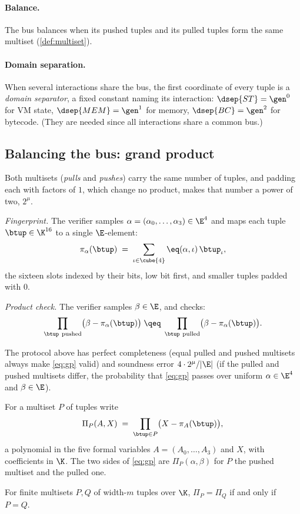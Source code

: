 \paragraph{Balance.} The bus balances when its pushed tuples and its pulled tuples form the same multiset (\ref{def:multiset}).

\paragraph{Domain separation.} When several interactions share the bus, the first coordinate of every tuple is a \emph{domain separator}, a fixed constant naming its interaction: $\dsep{ST}=\gen^{0}$ for VM state, $\dsep{MEM}=\gen^{1}$ for memory, $\dsep{BC}=\gen^{2}$ for bytecode. (They are needed since all interactions share a common bus.)

\subsection{Balancing the bus: grand product}\label{sec:gp}

Both multisets (\emph{pulls} and \emph{pushes}) carry the same number of tuples, and padding each with factors of $1$, which change no product, makes that number a power of two, $2^{\mu}$.

\emph{Fingerprint.} The verifier samples $\alpha=(\alpha_0,\dots,\alpha_3)\in\E^{4}$ and maps each tuple $\btup \in \K^{16}$ to a single $\E$-element:
\[
\pi_\alpha(\btup)\;=\;\sum_{\iota\in\cube{4}}\eq(\alpha,\iota)\,\btup_\iota ,
\]
the sixteen slots indexed by their bits, low bit first, and smaller tuples padded with $0$.

\emph{Product check.} The verifier samples $\beta\in\E$, and checks:
\begin{equation}
\prod_{\btup\ \text{pushed}}\bigl(\beta-\pi_\alpha(\btup)\bigr)
\;\qeq\;
\prod_{\btup\ \text{pulled}}\bigl(\beta-\pi_\alpha(\btup)\bigr).
\label{eq:gp}
\end{equation}

\begin{theorem}\label{th:product_check}
  The protocol above has perfect completeness (equal pulled and pushed multisets always make \eqref{eq:gp} valid) and soundness error $4\cdot 2^{\mu}/|\E|$ (if the pulled and pushed multisets differ, the probability that \eqref{eq:gp} passes over uniform $\alpha \in \E^{4}$ and $\beta \in \E$).
\end{theorem}

\begin{lemma}\label{lem:gp}
For a multiset $P$ of tuples write
\[
  \Pi_P(A,X)\;=\;\prod_{\btup\in P}\bigl(X-\pi_A(\btup)\bigr),
\]
a polynomial in the five formal variables $A=(A_0,\dots,A_3)$ and $X$, with coefficients in $\K$. The two sides of \eqref{eq:gp} are $\Pi_P(\alpha,\beta)$ for $P$ the pushed multiset and the pulled one.

For finite multisets $P,Q$ of width-$m$ tuples over $\K$, $\Pi_P=\Pi_Q$ if and only if $P=Q$.
\end{lemma}

